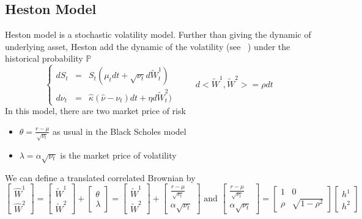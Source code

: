 \documentclass[a4paper,10pt]{article}
\begin{document}
\subsection{Heston Model}
Heston model is a stochastic volatility model. Further than giving the dynamic of underlying asset, Heston add the dynamic of the volatility (see ~\cite{MAREK}) under the historical probability $\mathbb{P}$
\[
\left\{ 
\begin{array}{rcl}
dS_t    &=& S_t( \mu_t dt + \sqrt{\nu_t} d \widetilde{W}^{1}_t )  \\ 
d\nu_t  &=& \hat{\kappa}( \hat{\nu} -\nu_t ) dt + \eta d \widetilde{W}^{2}_t )
\end{array}\right. 
\hspace{1cm}
d<\widetilde{W}^{1},\widetilde{W}^{2}> = \rho dt
\]
In this model, there are two market price of risk
\begin{itemize}
 \item $\theta = \frac{r-\mu}{\sqrt{\nu_t}}$ as usual in the Black Scholes model
 \item $\lambda=\alpha\sqrt{\nu_t}$ is the market price of volatility 
\end{itemize}
We can define a translated correlated Brownian by
\[
\left[
\begin{array}{c}
 \hat{W}^1  \\
 \hat{W}^2
\end{array}
\right]
=
\left[
\begin{array}{c}
 \widetilde{W}^1  \\
 \widetilde{W}^2
\end{array}
\right]
+
\left[
\begin{array}{c}
 \theta  \\
 \lambda
\end{array}
\right]
=
\left[
\begin{array}{c}
 \widetilde{W}^1  \\
 \widetilde{W}^2
\end{array}
\right]
+
\left[
\begin{array}{c}
 \frac{r-\mu}{\sqrt{\nu_t}}  \\
 \alpha\sqrt{\nu_t}
\end{array}
\right]
\text{ and }
\left[
\begin{array}{c}
 \frac{r-\mu}{\sqrt{\nu_t}}  \\
 \alpha\sqrt{\nu_t}
\end{array}
\right]
=
\left[
\begin{array}{cc}
 1    & 0  \\
 \rho & \sqrt{1-\rho^2}
\end{array}
\right]
\left[
\begin{array}{c}
 h^1\\
 h^2
\end{array}
\right]
\]
\end{document}
